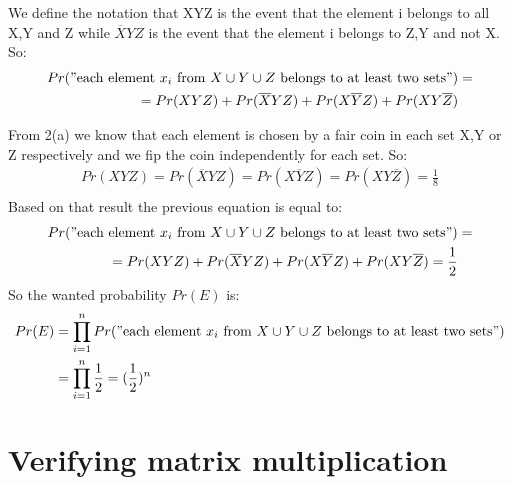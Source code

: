 \documentclass[11pt]{537homework}
\begin{document}
We define the notation that XYZ is the event that the element i belongs to all X,Y and Z while $\overline{X}YZ$ is the event that the element i belongs to Z,Y and not X. So:
\begingroup
\allowdisplaybreaks
\begin{align*}
  Pr("\text{each element $x_i$ from $X \cup Y \cup Z$ belongs to at least two sets}") &= \\ 
                                                = Pr(XYZ)+Pr(\overline{X}YZ)+Pr(X\overline{Y}Z)+Pr(XY\overline{Z}) \\
\end{align*}
\endgroup

From 2(a) we know that each element is chosen by a fair coin in each set X,Y or Z respectively and we fip the coin independently for each set. So:
\begingroup
\allowdisplaybreaks
\begin{align*}
    Pr(XYZ) = Pr(\overline{X}YZ) = Pr(X\overline{Y}Z) = Pr(XY\overline{Z}) = \frac{1}{8} \\
\end{align*}
\endgroup
Based on that result the previous equation is equal to:
\begingroup
\allowdisplaybreaks
\begin{align*}
  Pr("\text{each element $x_i$ from $X \cup Y \cup Z$ belongs to at least two sets}") &= \\ 
                                                = Pr(XYZ)+Pr(\overline{X}YZ)+Pr(X\overline{Y}Z)+Pr(XY\overline{Z}) = \frac{1}{2} \\
\end{align*}
\endgroup
So the wanted probability $Pr(E)$ is:
\begingroup
\allowdisplaybreaks
\begin{align*}
  Pr(E) &= \prod_{i=1}^{n} Pr("\text{each element $x_i$ from $X \cup Y \cup Z$ belongs to at least two sets}") \\
        &= \prod_{i=1}^{n} \frac{1}{2}= (\frac{1}{2})^n  \\
\end{align*}
\endgroup


\section{Verifying matrix multiplication}
\end{document}
